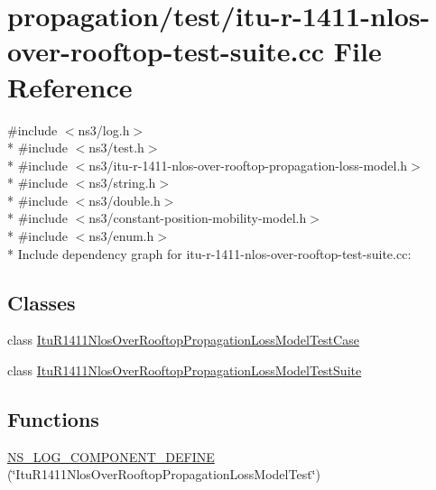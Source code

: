 \hypertarget{itu-r-1411-nlos-over-rooftop-test-suite_8cc}{}\section{propagation/test/itu-\/r-\/1411-\/nlos-\/over-\/rooftop-\/test-\/suite.cc File Reference}
\label{itu-r-1411-nlos-over-rooftop-test-suite_8cc}
{\ttfamily \#include $<$ns3/log.\+h$>$}\\*
{\ttfamily \#include $<$ns3/test.\+h$>$}\\*
{\ttfamily \#include $<$ns3/itu-\/r-\/1411-\/nlos-\/over-\/rooftop-\/propagation-\/loss-\/model.\+h$>$}\\*
{\ttfamily \#include $<$ns3/string.\+h$>$}\\*
{\ttfamily \#include $<$ns3/double.\+h$>$}\\*
{\ttfamily \#include $<$ns3/constant-\/position-\/mobility-\/model.\+h$>$}\\*
{\ttfamily \#include $<$ns3/enum.\+h$>$}\\*
Include dependency graph for itu-\/r-\/1411-\/nlos-\/over-\/rooftop-\/test-\/suite.cc\+:
\subsection*{Classes}
\begin{DoxyCompactItemize}
\item 
class \hyperlink{classItuR1411NlosOverRooftopPropagationLossModelTestCase}{Itu\+R1411\+Nlos\+Over\+Rooftop\+Propagation\+Loss\+Model\+Test\+Case}
\item 
class \hyperlink{classItuR1411NlosOverRooftopPropagationLossModelTestSuite}{Itu\+R1411\+Nlos\+Over\+Rooftop\+Propagation\+Loss\+Model\+Test\+Suite}
\end{DoxyCompactItemize}
\subsection*{Functions}
\begin{DoxyCompactItemize}
\item 
\hyperlink{itu-r-1411-nlos-over-rooftop-test-suite_8cc_abaf78d1d7493ec30f09932c5cf04e37c}{N\+S\+\_\+\+L\+O\+G\+\_\+\+C\+O\+M\+P\+O\+N\+E\+N\+T\+\_\+\+D\+E\+F\+I\+NE} (\char`\"{}Itu\+R1411\+Nlos\+Over\+Rooftop\+Propagation\+Loss\+Model\+Test\char`\"{})
\end{DoxyCompactItemize}
